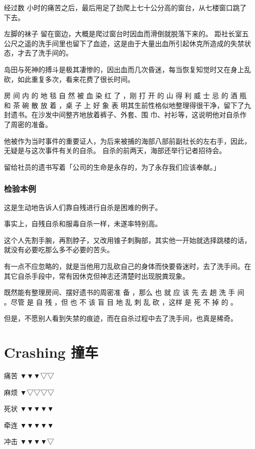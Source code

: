 \documentclass[UTF8]{ctexart}
\begin{document}
经过数 小时的痛苦之后，最后用足了劲爬上七十公分高的窗台，从七楼窗口跳了下去。

左脚的袜子 留在窗边，大概是爬过窗台时因血而滑倒就脱落下来的。 
距社长室五公尺之遥的洗手间里也留下了血迹，这是由于大量出血所引起休克所造成的失禁状态，才去了洗手间的。

岛田与死神的搏斗是极其凄惨的，因出血而几次昏迷，每当恢复知觉时又在身上乱砍，如此重复多次，看来花费了很长时间。

房 间 内 的 地 毯 自 然 被 血 染 红 了 ，刚 打 开 的 山 得 利 威 士 忌 的 酒 瓶 和 茶 碗 散 放 着 ，桌 子 上 好 象 表 明其生前性格似地整理得很干净，留下了九封遗书。在沙发中间整齐地放着裤子、外套、围 巾、衬衫等，这说明他对自杀作了周密的准备。

他被作为当时事件的重要证人，为后来被捕的海部八部前副社长的左右手，因此，无疑是与这次事件有关的自杀。
自杀的前两天，海部还举行记者招待会。

留给社员的遗书写着「公司的生命是永存的，为了永存我们应该奉献。」

\subsubsection*{检验本例}

这是生动地告诉人们靠自残进行自杀是困难的例子。

事实上，自残自杀和服毒自杀一样，未遂率特别高。

这个人先割手腕，再割脖子，又改用锥子刺胸部，其实他一开始就选择跳楼的话，就没有必要吃那么多不必要的苦头。

有一点不应忽略的，就是当他用刀乱砍自己的身体而快要昏迷时，去了洗手间。在其它自杀手段中，常有因休克但神志还清楚时出现脱粪现象。

既然能有整理房间、摆好遗书的周密准 备 ，那么 也 就 应 该 先 去 趟 洗 手 间 。尽管 是 自 残 ，但 也 不 该 盲 目 地 乱 刺 乱 砍 ，这样 是 死 不 掉 的 。

但是，不愿别人看到失禁的痕迹，而在自杀过程中去了洗手间，也真是稀奇。

\newpage

\section{Crashing 撞车}

痛苦 ▼▼▼▽▽

麻烦 ▼▽▽▽▽

死状 ▼▼▼▼▼

牵连 ▼▼▼▼▼

冲击 ▼▼▼▼▽
\end{document}

